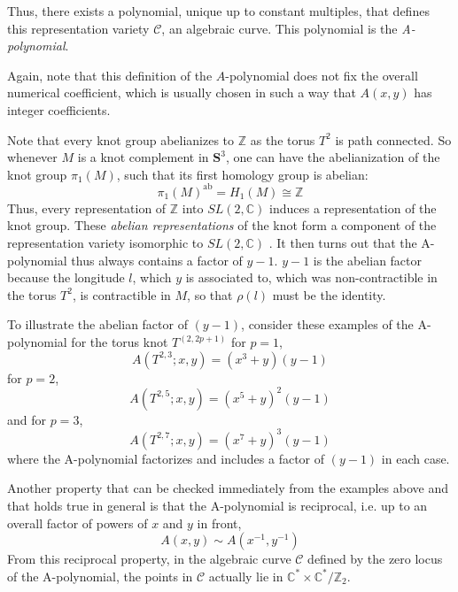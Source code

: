 \documentclass[a4paper,titlepage,twoside]{book}
\begin{document}
Thus, there exists a polynomial, unique up to constant multiples, that defines this representation variety $\mathcal{C}$, an algebraic curve.  This polynomial is the \emph{A-polynomial}.  


Again, note that this definition of the $A$-polynomial does not fix the overall numerical coefficient, which is usually chosen in such a way that $A(x,y)$ has integer coefficients.  

Note that every knot group abelianizes to $\mathbb{Z}$ as the torus $T^2$ is path connected.  So whenever $M$ is a knot complement in $\mathbf{S}^3$, one can have the abelianization of the knot group $\pi_1(M)$, such that its first homology group is abelian: 
\begin{equation}
  \pi_1{ (M)}^{\text{ab}} = H_1{ (M)} \cong \mathbb{Z}
\end{equation}
Thus, every representation of $\mathbb{Z}$ into $SL{(2,\mathbb{C})}$ induces a representation of the knot group.  These \emph{abelian representations} of the knot form a component of the representation variety isomorphic to $SL{(2,\mathbb{C})}$ \cite{CooperLong1996}.  It then turns out that the A-polynomial thus always contains a factor of $y-1$.  $y-1$ is the abelian factor because the longitude $l$, which $y$ is associated to, which was non-contractible in the torus $T^2$, is contractible in $M$, so that $\rho{(l)}$ must be the identity.  

To illustrate the abelian factor of $(y-1)$, consider these examples of the A-polynomial for the torus knot $T^{(2,2p+1)}$ for $p=1$,
\begin{equation}
A{ (T^{2,3}; x,y)} = {\left(x^{3} + y\right)} {\left(y - 1\right)}
\end{equation}
for $p=2$,
\begin{equation}
 A{ (T^{2,5}; x,y)} = {\left(x^{5} + y\right)}^{2} {\left(y - 1\right)}
\end{equation}
and for $p=3$,
\begin{equation}
 A{ (T^{2,7}; x,y)} =  {\left(x^{7} + y\right)}^{3} {\left(y - 1\right)}
\end{equation}
where the A-polynomial factorizes and includes a factor of $(y-1)$ in each case.

Another property that can be checked immediately from the examples above and that holds true in general is that the A-polynomial is reciprocal, i.e. up to an overall factor of powers of $x$ and $y$ in front, 
\begin{equation}
  A(x,y) \sim A(x^{-1},y^{-1}) \label{eq:Apolyreci}
\end{equation}
From this reciprocal property, in the algebraic curve $\mathcal{C}$ defined by the zero locus of the A-polynomial, the points in $\mathcal{C}$ actually lie in $\mathbb{C}^* \times \mathbb{C}^* /\mathbb{Z}_2$.  
\end{document}
